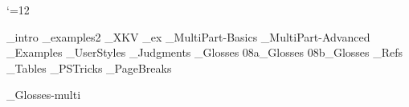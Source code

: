 



 \catcode`\@=12









\gathertags



  \bye
%

%
%

_intro
_examples2
_XKV
_ex
_MultiPart-Basics
_MultiPart-Advanced
_Examples
_UserStyles
_Judgments
_Glosses
\get 08a_Glosses
\get 08b_Glosses
_Refs
_Tables
_PSTricks
_PageBreaks
%
%


\bye
_Glosses-multi

